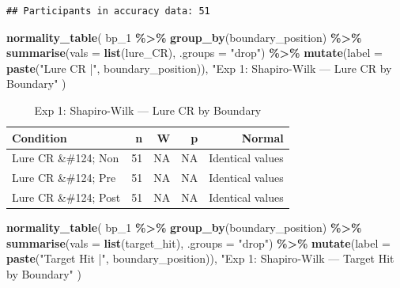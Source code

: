 \documentclass[
]{article}
\newenvironment{Shaded}{\begin{snugshade}}{\end{snugshade}}
\newcommand{\AttributeTok}[1]{\textcolor[rgb]{0.13,0.29,0.53}{#1}}
\newcommand{\FunctionTok}[1]{\textcolor[rgb]{0.13,0.29,0.53}{\textbf{#1}}}
\newcommand{\NormalTok}[1]{#1}
\newcommand{\SpecialCharTok}[1]{\textcolor[rgb]{0.81,0.36,0.00}{\textbf{#1}}}
\newcommand{\StringTok}[1]{\textcolor[rgb]{0.31,0.60,0.02}{#1}}
\begin{document}
\begin{verbatim}
## Participants in accuracy data: 51
\end{verbatim}

\begin{Shaded}
\begin{Highlighting}[]
\FunctionTok{normality\_table}\NormalTok{(}
\NormalTok{  bp\_1 }\SpecialCharTok{\%\textgreater{}\%} \FunctionTok{group\_by}\NormalTok{(boundary\_position) }\SpecialCharTok{\%\textgreater{}\%}
    \FunctionTok{summarise}\NormalTok{(}\AttributeTok{vals =} \FunctionTok{list}\NormalTok{(lure\_CR), }\AttributeTok{.groups =} \StringTok{"drop"}\NormalTok{) }\SpecialCharTok{\%\textgreater{}\%}
    \FunctionTok{mutate}\NormalTok{(}\AttributeTok{label =} \FunctionTok{paste}\NormalTok{(}\StringTok{"Lure CR |"}\NormalTok{, boundary\_position)),}
  \StringTok{"Exp 1: Shapiro{-}Wilk — Lure CR by Boundary"}
\NormalTok{)}
\end{Highlighting}
\end{Shaded}

\begingroup\fontsize{12}{14}\selectfont

\begin{longtable}[t]{lrrrr}
\caption{\label{tab:exp1_acc_normality}Exp 1: Shapiro-Wilk — Lure CR by Boundary}\\
\toprule
Condition & n & W & p & Normal\\
\midrule
Lure CR \&\#124; Non & 51 & NA & NA & Identical values\\
Lure CR \&\#124; Pre & 51 & NA & NA & Identical values\\
Lure CR \&\#124; Post & 51 & NA & NA & Identical values\\
\bottomrule
\end{longtable}
\endgroup{}

\begin{Shaded}
\begin{Highlighting}[]
\FunctionTok{normality\_table}\NormalTok{(}
\NormalTok{  bp\_1 }\SpecialCharTok{\%\textgreater{}\%} \FunctionTok{group\_by}\NormalTok{(boundary\_position) }\SpecialCharTok{\%\textgreater{}\%}
    \FunctionTok{summarise}\NormalTok{(}\AttributeTok{vals =} \FunctionTok{list}\NormalTok{(target\_hit), }\AttributeTok{.groups =} \StringTok{"drop"}\NormalTok{) }\SpecialCharTok{\%\textgreater{}\%}
    \FunctionTok{mutate}\NormalTok{(}\AttributeTok{label =} \FunctionTok{paste}\NormalTok{(}\StringTok{"Target Hit |"}\NormalTok{, boundary\_position)),}
  \StringTok{"Exp 1: Shapiro{-}Wilk — Target Hit by Boundary"}
\NormalTok{)}
\end{Highlighting}
\end{Shaded}
\end{document}
